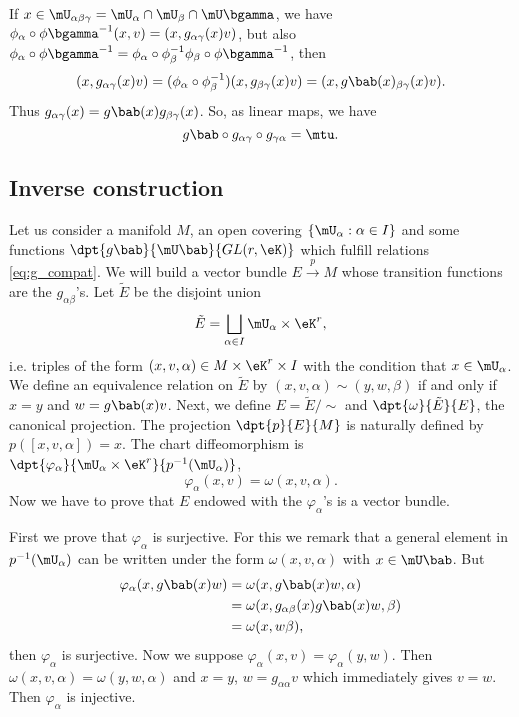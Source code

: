 If $x\in\mU_{\alpha\beta\gamma}=\mU_{\alpha}\cap\mU_{\beta}\cap\mU\bgamma$, we have $\phi_{\alpha}\circ\phi\bgamma^{-1}(x,v)=(x,g_{\alpha\gamma}(x)v)$, but also $\phi_{\alpha}\circ\phi\bgamma^{-1}=\phi_{\alpha}\circ\phi_{\beta}^{-1}\phi_{\beta}\circ\phi\bgamma^{-1}$, then
\begin{equation}
  (x,g_{\alpha\gamma}(x)v)=(\phi_{\alpha}\circ\phi_{\beta}^{-1})(x,g_{\beta\gamma}(x)v)
               =(x,g\bab(x)_{\beta\gamma}(x)v).
\end{equation}
Thus $g_{\alpha\gamma}(x)=g\bab(x)g_{\beta\gamma}(x)$. So, as linear maps, we have
\begin{equation}\label{eq:g_compat}
  g\bab\circ g_{\alpha\gamma}\circ g_{\gamma\alpha}=\mtu.
\end{equation}

\subsection{Inverse construction}\label{subsec:inv_g}

Let us consider a manifold $M$, an open covering $\{\mU_{\alpha}:\alpha\in I\}$ and some functions $\dpt{g\bab}{\mU\bab}{GL(r,\eK)}$ which fulfill relations \eqref{eq:g_compat}. We will build a vector bundle $E\stackrel{p}{\longrightarrow}M$ whose transition functions are the $g_{\alpha\beta}$'s. Let $\tilde{E}$ be the disjoint union
\[
  \tilde{E}=\bigsqcup_{\alpha\in I}\mU_{\alpha}\times\eK^r,
\]
i.e. triples of the form $(x,v,\alpha)\in M\times\eK^r\times I$ with the condition that $x\in\mU_{\alpha}$. We define an equivalence relation on $\tilde{E}$ by $(x,v,\alpha)\sim(y,w,\beta)$ if and only if $x=y$ and $w=g\bab(x)v$. Next, we define $E=\tilde{E}/\sim$ and $\dpt{\omega}{\tilde{E}}{E}$, the canonical projection. The projection $\dpt{p}{E}{M}$ is naturally defined by $p([x,v,\alpha])=x$. The chart diffeomorphism is $\dpt{\varphi_{\alpha}}{\mU_{\alpha}\times\eK^r}{p^{-1}(\mU_{\alpha})}$, 
\[
  \varphi_{\alpha}(x,v)=\omega(x,v,\alpha).
\]
Now we have to prove that $E$ endowed with the $\varphi_{\alpha}$'s is a vector bundle.

First we prove that $\varphi_{\alpha}$ is surjective. For this we remark that a general element in $p^{-1}(\mU_{\alpha})$ can be written under the form $\omega(x,v,\alpha)$ with $x\in\mU\bab$. But
\begin{equation}
\begin{split}
  \varphi_{\alpha}(x,g\bab(x)w)&=\omega(x,g\bab(x)w,\alpha)\\
                         &=\omega(x,g_{\alpha\beta}(x)g\bab(x)w,\beta)\\
			 &=\omega(x,w\beta),
\end{split}
\end{equation}
then $\varphi_{\alpha}$ is surjective. Now we suppose $\varphi_{\alpha}(x,v)=\varphi_{\alpha}(y,w)$. Then $\omega(x,v,\alpha)=\omega(y,w,\alpha)$ and $x=y$, $w=g_{\alpha\alpha}v$ which immediately gives $v=w$. Then $\varphi_{\alpha}$ is injective.

